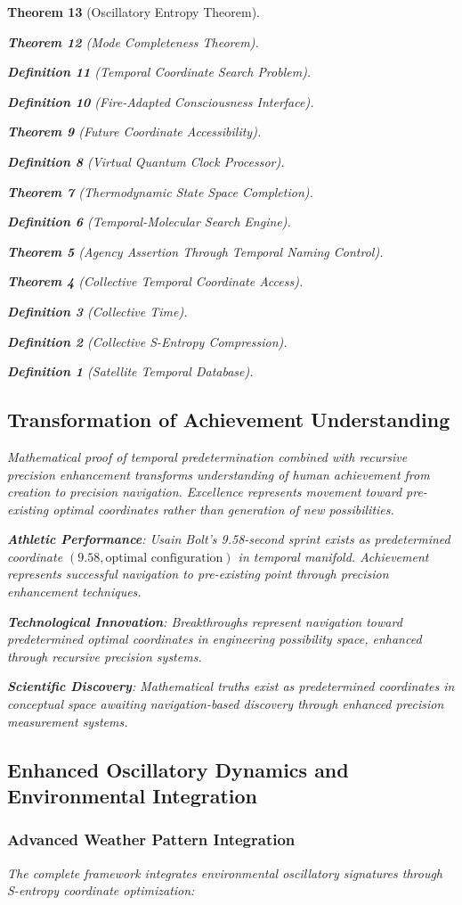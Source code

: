 \documentclass[12pt,a4paper]{article}
\newtheorem{theorem}{Theorem}[section]
\newtheorem{definition}[theorem]{Definition}
\begin{document}
\begin{theorem}[Oscillatory Entropy Theorem]
\begin{theorem}[Mode Completeness Theorem]
\begin{enumerate}
\begin{definition}[Temporal Coordinate Search Problem]
\begin{algorithm}
\begin{definition}[Fire-Adapted Consciousness Interface]
\begin{theorem}[Future Coordinate Accessibility]
\begin{definition}[Virtual Quantum Clock Processor]
\begin{itemize}
\begin{itemize}
\begin{theorem}[Thermodynamic State Space Completion]
\begin{definition}[Temporal-Molecular Search Engine]
\begin{theorem}[Agency Assertion Through Temporal Naming Control]
\begin{remark}
\begin{theorem}[Collective Temporal Coordinate Access]
\begin{definition}[Collective Time]
\begin{definition}[Collective S-Entropy Compression]
\begin{definition}[Satellite Temporal Database]
\begin{algorithm}
\begin{table}[h]
{{\subsection{Transformation of Achievement Understanding}

Mathematical proof of temporal predetermination combined with recursive precision enhancement transforms understanding of human achievement from creation to precision navigation. Excellence represents movement toward pre-existing optimal coordinates rather than generation of new possibilities.

\textbf{Athletic Performance}: Usain Bolt's 9.58-second sprint exists as predetermined coordinate $(9.58, \text{optimal configuration})$ in temporal manifold. Achievement represents successful navigation to pre-existing point through precision enhancement techniques.

\textbf{Technological Innovation}: Breakthroughs represent navigation toward predetermined optimal coordinates in engineering possibility space, enhanced through recursive precision systems.

\textbf{Scientific Discovery}: Mathematical truths exist as predetermined coordinates in conceptual space awaiting navigation-based discovery through enhanced precision measurement systems.

\subsection{Enhanced Oscillatory Dynamics and Environmental Integration}

\subsubsection{Advanced Weather Pattern Integration}

The complete framework integrates environmental oscillatory signatures through S-entropy coordinate optimization:

}}
\end{table}
\end{algorithm}
\end{definition}
\end{definition}
\end{definition}
\end{theorem}
\end{remark}
\end{theorem}
\end{definition}
\end{theorem}
\end{itemize}
\end{itemize}
\end{definition}
\end{theorem}
\end{definition}
\end{algorithm}
\end{definition}
\end{enumerate}
\end{theorem}
\end{theorem}
\end{document}
